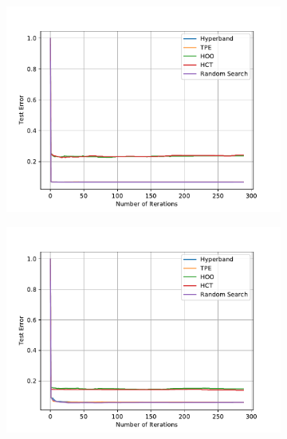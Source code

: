 \documentclass[twoside,11pt]{article}
\begin{document}
\begin{figure}
\begin{subfigure}[t]{0.3\textwidth}
    \caption{\GBM}
  \end{subfigure}
  \begin{subfigure}[t]{0.3\textwidth}
    \centering\includegraphics[width=\textwidth]{img/uci/knn_1.pdf}
    \caption{\KNN}
  \end{subfigure}
  \begin{subfigure}[t]{0.3\textwidth}
    \centering\includegraphics[width=\textwidth]{img/uci/sk_mlp_1.pdf}
    \caption{\MLP}
  \end{subfigure}
  \begin{subfigure}[t]{0.3\textwidth}

\end{subfigure}
\end{figure}
\end{document}
